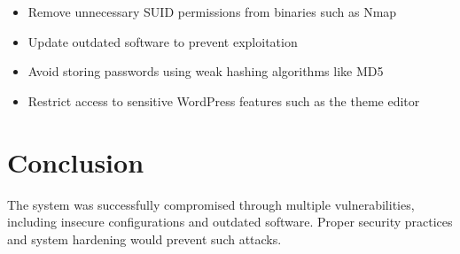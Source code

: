 \documentclass[11pt]{article}
\begin{document}
\begin{itemize}
\item Remove unnecessary SUID permissions from binaries such as Nmap
\item Update outdated software to prevent exploitation
\item Avoid storing passwords using weak hashing algorithms like MD5
\item Restrict access to sensitive WordPress features such as the theme editor
\end{itemize}

\section{Conclusion}

The system was successfully compromised through multiple vulnerabilities, including insecure configurations and outdated software.  
Proper security practices and system hardening would prevent such attacks.
\end{document}
